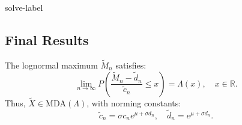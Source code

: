 \begin{solve}{}{solve-label}
\subsection*{Final Results}
The lognormal maximum $\tilde{M}_n$ satisfies:
\[
\lim_{n \to \infty} P\left( \frac{\tilde{M}_n - \tilde{d}_n}{\tilde{c}_n} \leq x \right) = \Lambda(x), \quad x \in \mathbb{R}.
\]
Thus, $\tilde{X} \in \text{MDA}(\Lambda)$, with norming constants:
\[
\tilde{c}_n = \sigma c_n e^{\mu + \sigma d_n}, \quad \tilde{d}_n = e^{\mu + \sigma d_n}.
\]
		
		\cite{Embrechts.etal1997}
	\end{solve}
	
	
	
	
	
